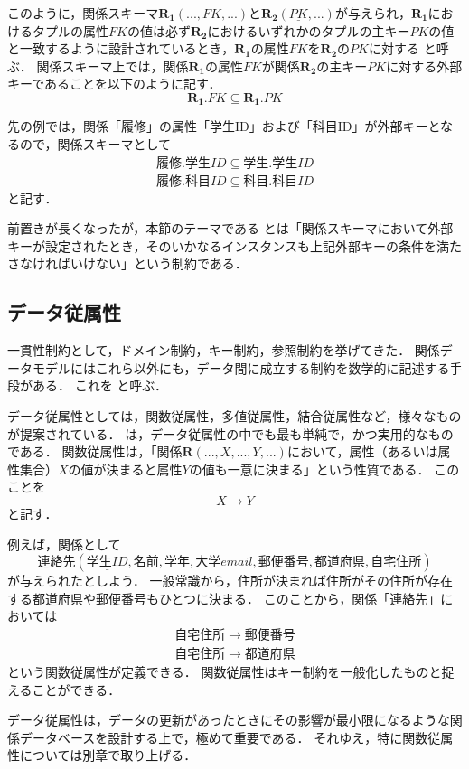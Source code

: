 このように，関係スキーマ$\boldsymbol{R_1}(..., FK, ...)$と$\boldsymbol{R_2}(\underline{PK}, ...)$が与えられ，$\boldsymbol{R_1}$におけるタプルの属性$FK$の値は必ず$\boldsymbol{R_2}$におけるいずれかのタプルの主キー$PK$の値と一致するように設計されているとき，$\boldsymbol{R_1}$の属性$FK$を$\boldsymbol{R_2}$の$PK$に対する と呼ぶ．
関係スキーマ上では，関係$\boldsymbol{R_1}$の属性$FK$が関係$\boldsymbol{R_2}$の主キー$PK$に対する外部キーであることを以下のように記す．
\begin{equation}
\boldsymbol{R_1}.FK \subseteq \boldsymbol{R_1}.PK
\end{equation}

先の例では，関係「履修」の属性「学生ID」および「科目ID」が外部キーとなるので，関係スキーマとして
\begin{eqnarray}
履修.学生ID \subseteq 学生.学生ID \\
履修.科目ID \subseteq 科目.科目ID
\end{eqnarray}
と記す．

前置きが長くなったが，本節のテーマである とは「関係スキーマにおいて外部キーが設定されたとき，そのいかなるインスタンスも上記外部キーの条件を満たさなければいけない」という制約である．

\subsection{データ従属性}
一貫性制約として，ドメイン制約，キー制約，参照制約を挙げてきた．
関係データモデルにはこれら以外にも，データ間に成立する制約を数学的に記述する手段がある．
これを と呼ぶ．

データ従属性としては，関数従属性，多値従属性，結合従属性など，様々なものが提案されている．
 は，データ従属性の中でも最も単純で，かつ実用的なものである．
関数従属性は，「関係$\boldsymbol{R}(..., X, ..., Y, ...)$において，属性（あるいは属性集合）$X$の値が決まると属性$Y$の値も一意に決まる」という性質である．
このことを
\begin{equation}
X \to Y
\end{equation}
と記す．

例えば，関係として
\begin{equation}
連絡先(\underline{学生ID}, 名前, 学年, 大学email, 郵便番号, 都道府県, 自宅住所)
\end{equation}
が与えられたとしよう．
一般常識から，住所が決まれば住所がその住所が存在する都道府県や郵便番号もひとつに決まる．
このことから，関係「連絡先」においては
\begin{eqnarray}
自宅住所 \to 郵便番号 \\
自宅住所 \to 都道府県
\end{eqnarray}
という関数従属性が定義できる．
関数従属性はキー制約を一般化したものと捉えることができる．

データ従属性は，データの更新があったときにその影響が最小限になるような関係データベースを設計する上で，極めて重要である．
それゆえ，特に関数従属性については別章で取り上げる．
